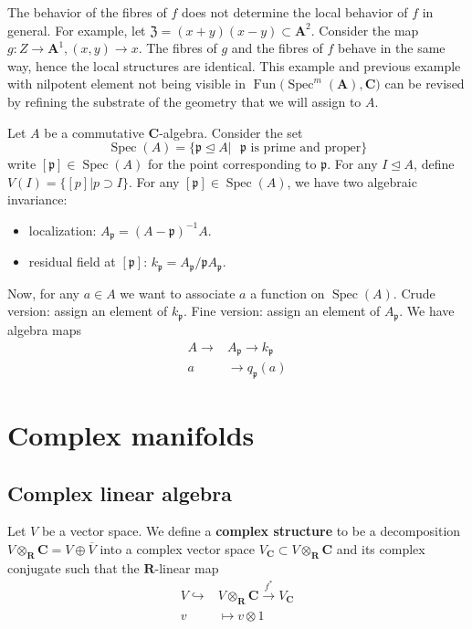 \documentclass[
11pt, %
letterpaper， %
oneside, %
headinclude,footinclude, %
BCOR5mm, %
]{scrartcl}
\newcommand{\R}{{\mathbf{R}}}
\newcommand{\C}{{\mathbf{C}}}
\newcommand{\A}{{\mathbf{A}}}
\newcommand{\p}{{\mathfrak{p}}}
\newcommand{\fun}{\operatorname{Fun}}
\newcommand{\spec}{\operatorname{Spec}}
\newcommand{\bfs}{\textbf}
\begin{document}
\begin{rem}
	The behavior of the fibres of $f$ does not determine the local behavior of $f$ in general. For example, let $\mathfrak{Z}=(x+y)(x-y)\subset \A^2$. Consider the map $g:Z\to \A^1, (x,y)\to x$. The fibres of $g$ and the fibres of $f$ behave in the same way, hence the local structures are identical. This example and previous example with nilpotent element not being visible in $\fun\big(\spec^m(\A), \C \big)$ can be revised by refining the substrate of the geometry that we will assign to $A$.  
\end{rem}

Let $A$ be  a commutative $\C$-algebra. Consider the set
\begin{equation}
	\spec(A)=\{ \p \unlhd A | \text{ $\p$ is prime and proper}	 \}
\end{equation}
write $[\p]\in \spec(A)$ for the point corresponding to $\p$. For any $I\unlhd A$, define $V(I)=\{[p]|p\supset I \}$. For any $[\p]\in \spec(A)$, we have two algebraic invariance:
\begin{itemize}
	\item localization: $A_{\p}=(A-\p)^{-1}A$.
	\item residual field at $[\p]$: $k_{\p}=A_{\p}/\p A_{\p}$. 
\end{itemize}
Now, for any $a\in A$ we want to associate $a$ a function on $\spec(A)$. Crude version: assign an element of $k_{\p}$. Fine version: assign an element of $A_{\p}$. We have algebra maps
\begin{align*}
A\longrightarrow& A_{\p} \longrightarrow k_{\p}\\
a&\longrightarrow q_{\p}(a)
\end{align*}
\section{Complex manifolds}
\subsection{Complex linear algebra}
Let $V$ be a vector space. We define a \bfs{complex structure} to be a decomposition $V\otimes_{\R}\C=V\oplus \overline{V}$ into a complex vector space $V_{\C}\subset V\otimes_{\R}\C$ and its complex conjugate such that the $\R$-linear map
\begin{align*}
V\hookrightarrow& V\otimes_{\R}\C \stackrel{f^*}{\to} V_{\C}\\
v&\mapsto v\otimes 1
\end{align*}
\end{document}
